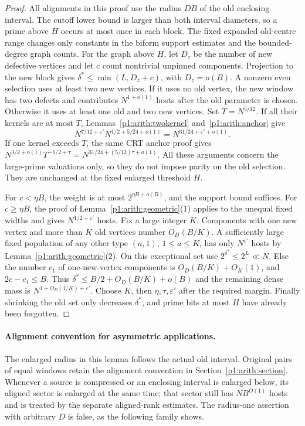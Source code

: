 \begin{proof}
All alignments in this proof use the radius $DB$ of the old enclosing
interval.  The cutoff lower bound is larger than both interval diameters,
so a prime above $H$ occurs at most once in each block.
The fixed expanded old-centre range changes only constants in the
biform support estimates and the bounded-degree graph counts.
For the graph above $H$, let $D_z$ be the number of new defective vertices
and let $c$ count nontrivial unpinned components.  Projection to the new
block gives $\delta^*\leq\min(L,D_z+c)$, with $D_z=o(B)$.
A nonzero even selection uses at least two new vertices.  If it uses no
old vertex, the new window has two defects and contributes $N^{1+o(1)}$
hosts after the old parameter is chosen.  Otherwise it uses at least one
old and two new vertices.  Set $T=N^{5/12}$.
If all their kernels are at most $T$, Lemmas~\ref{p1:arith:twokernel}
and~\ref{p1:arith:anchor} give
\[
 N^{7/12+\varepsilon'}N^{1/2+5/24+o(1)}=N^{31/24+\varepsilon'+o(1)}.
\]
If one kernel exceeds $T$, the same CRT anchor proof gives
$N^{3/2+o(1)}T^{-1/2+\tau}=N^{31/24+(5/12)\tau+o(1)}$.
All these arguments concern the large-prime valuations only, so they do
not impose parity on the old selection.  They are unchanged at the
fixed enlarged threshold $H$.

For $c<\eta B$, the weight is at most $2^{\eta B+o(B)}$, and the support
bound suffices.  For $c\geq\eta B$, the proof of
Lemma~\ref{p1:arith:geometric}(1) applies to the unequal fixed widths and
gives $N^{1/2+\varepsilon'}$ hosts.  Fix a large integer $K$.  Components
with one new vertex and more than $K$ old vertices number $O_D(B/K)$.
A sufficiently large fixed population of any other type $(a,1)$,
$1\leq a\leq K$, has only $N^{\varepsilon'}$ hosts by
Lemma~\ref{p1:arith:geometric}(2).  On this exceptional set use
$2^{\delta^*}\leq2^L\ll N$.  Else the number $c_1$ of one-new-vertex
components is $O_D(B/K)+O_K(1)$, and $2c-c_1\leq B$.  Thus
$\delta^*\leq B/2+O_D(B/K)+o(B)$ and the remaining dense mass is
$N^{1+O_D(1/K)+\varepsilon'}$.
Choose $K$, then $\eta,\tau,\varepsilon'$ after the required margin.
Finally shrinking the old set only decreases $\delta^*$, and prime bits
at most $H$ have already been forgotten.
\end{proof}

\paragraph{Alignment convention for asymmetric applications.}
The enlarged radius in this lemma follows the actual old interval.
Original pairs of equal windows retain the alignment convention in
Section~\ref{p1:arith:section}.  Whenever a source is compressed or an enclosing
interval is enlarged below, its aligned sector is enlarged at the
same time; that sector still has $NB^{O(1)}$ hosts and is treated by
the separate aligned-rank estimates.  The radius-one assertion with
arbitrary $D$ is false, as the following family shows.

